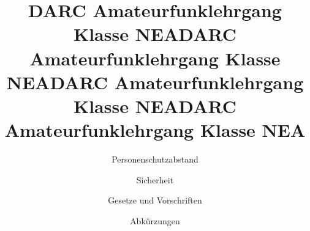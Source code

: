 \documentclass[aspectratio = 169]{beamer}
\begin{document}
\title{DARC Amateurfunklehrgang Klasse NEA}
\author{Personenschutzabstand}
\begin{frame}
\maketitle
\end{frame}


















\title{DARC Amateurfunklehrgang Klasse NEA}
\author{Sicherheit}
\begin{frame}
\maketitle
\end{frame}














\title{DARC Amateurfunklehrgang Klasse NEA}
\author{Gesetze und Vorschriften}
\begin{frame}
\maketitle
\end{frame}










\title{DARC Amateurfunklehrgang Klasse NEA}
\author{Abkürzungen}
\begin{frame}
\maketitle
\end{frame}



\end{document}
